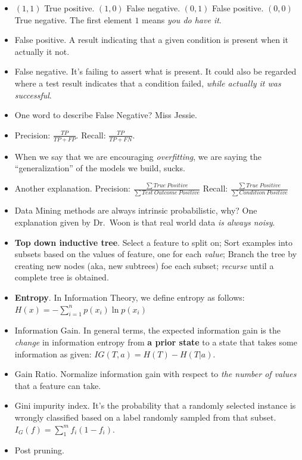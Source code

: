 \documentclass[twocolumn]{article}
\begin{document}
\begin{itemize}
\begin{figure}[htbp]
  \end{figure}
\item $(1,1)$ True positive. $(1,0)$ False negative. $(0,1)$ False
  positive. $(0,0)$ True negative. The first element $1$ means
  \emph{you do have it}.
\item False positive. A result indicating that a given condition is
  present when it actually it not.
\item False negative. It's failing to assert what is present. It could
  also be regarded where a test result indicates that a condition
  failed, \emph{while actually it was successful}.
\item One word to describe False Negative? Miss Jessie.
\item Precision: $\frac{TP}{TP+FP}$. Recall: $\frac{TP}{TP+FN}$.
\item When we say that we are encouraging \emph{overfitting}, we are
  saying the ``generalization'' of the models we build, sucks. 
\item Another explanation. Precision: $\frac{\sum
    True~Positive}{\sum Test~Outcome~Positive}$ Recall: $\frac{\sum
    True~Positive}{\sum Condition~Positive}$
\item Data Mining methods are always intrinsic probabilistic, why? One
  explanation given by Dr.\ Woon is that real world data \emph{is
    always noisy}.
\item \textbf{Top down inductive tree}. Select a feature to split on;
  Sort examples into subsets based on the values of feature, one for
  each \emph{value}; Branch the tree by creating new nodes (aka, new
  subtrees) foe each subset; \emph{recurse} until a complete tree is
  obtained. 
\item \textbf{Entropy}. In Information Theory, we define entropy as
  follows: $H(x)=-\sum_{i=1}^{n}p(x_{i})\ln p(x_{i})$
\item Information Gain. In general terms, the expected information
  gain is the \emph{change} in information entropy from \textbf{a
    prior state} to a state that takes some information as given:
  $IG(T,a)=H(T)-H(T|a)$.
\item Gain Ratio. Normalize information gain with respect to \emph{the
  number of values} that a feature can take.
\item Gini impurity index. It's the probability that a randomly
  selected instance is wrongly classified based on a label randomly
  sampled from that subset. $I_{G}(f)=\sum_{1}^{m}f_{i}(1-f_{i})$.
\item Post pruning. 
\end{itemize}
\end{document}
